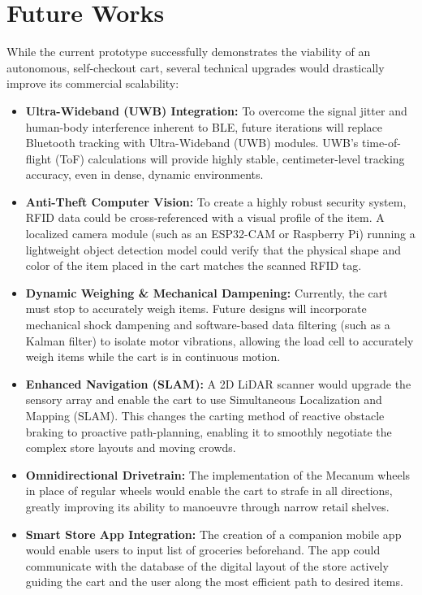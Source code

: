 \documentclass[12pt,a4paper]{article}
\begin{document}
\section{Future Works}
While the current prototype successfully demonstrates the viability of an autonomous, self-checkout cart, several technical upgrades would drastically improve its commercial scalability:
\begin{itemize}
    \item \textbf{Ultra-Wideband (UWB) Integration:} To overcome the signal jitter and human-body interference inherent to BLE, future iterations will replace Bluetooth tracking with Ultra-Wideband (UWB) modules. UWB's time-of-flight (ToF) calculations will provide highly stable, centimeter-level tracking accuracy, even in dense, dynamic environments.

    \item \textbf{Anti-Theft Computer Vision:} To create a highly robust security system, RFID data could be cross-referenced with a visual profile of the item. A localized camera module (such as an ESP32-CAM or Raspberry Pi) running a lightweight object detection model could verify that the physical shape and color of the item placed in the cart matches the scanned RFID tag.

    \item \textbf{Dynamic Weighing \& Mechanical Dampening:} Currently, the cart must stop to accurately weigh items. Future designs will incorporate mechanical shock dampening and software-based data filtering (such as a Kalman filter) to isolate motor vibrations, allowing the load cell to accurately weigh items while the cart is in continuous motion.

    \item \textbf{Enhanced Navigation (SLAM):}  A 2D LiDAR scanner would upgrade the sensory array and enable the cart to use Simultaneous Localization and Mapping (SLAM). This changes the carting method of reactive obstacle braking to proactive path-planning, enabling it to smoothly negotiate the complex store layouts and moving crowds.

    \item \textbf{Omnidirectional Drivetrain:} The implementation of the Mecanum wheels in place of regular wheels would enable the cart to strafe in all directions, greatly improving its ability to manoeuvre through narrow retail shelves.

    \item \textbf{Smart Store App Integration:} The creation of a companion mobile app would enable users to input list of groceries beforehand. The app could communicate with the database of the digital layout of the store actively guiding the cart and the user along the most efficient path to desired items.
\end{itemize}
\end{document}
